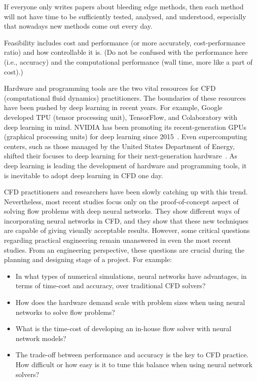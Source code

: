 
If everyone only writes papers about bleeding edge methods, then each method will not have time to be sufficiently tested, analysed, and understood, especially that nowadays new methods come out every day.

Feasibility includes cost and performance (or more accurately, cost-performance ratio) and how controllable it is.
(Do not be confused with the performance here (i.e., accuracy) and the computational performance (wall time, more like a part of cost).)

Hardware and programming tools are the two vital resources for CFD (computational fluid dynamics) practitioners.
The boundaries of these resources have been pushed by deep learning in recent years.
For example, Google developed TPU (tensor processing unit), TensorFlow, and Colaboratory with deep learning in mind.
NVIDIA has been promoting its recent-generation GPUs (graphical processing units) for deep learning since 2015~\cite{Buck2015}.
Even supercomputing centers, such as those managed by the United States Department of Energy, shifted their focuses to deep learning for their next-generation hardware~\cite{USDepartmentofEnergy2019}.
As deep learning is leading the development of hardware and programming tools, it is inevitable to adopt deep learning in CFD one day.

CFD practitioners and researchers have been slowly catching up with this trend.
Nevertheless, most recent studies focus only on the proof-of-concept aspect of solving flow problems with deep neural networks.
They show different ways of incorporating neural networks in CFD, and they show that these new techniques are capable of giving visually acceptable results.
However, some critical questions regarding practical engineering remain unanswered in even the most recent studies.
From an engineering perspective, these questions are crucial during the planning and designing stage of a project.
For example:

\begin{itemize}
    \item In what types of numerical simulations, neural networks have advantages, in terms of time-cost and accuracy, over traditional CFD solvers?
    \item How does the hardware demand scale with problem sizes when using neural networks to solve flow problems?
    \item What is the time-cost of developing an in-house flow solver with neural network models?
    \item The trade-off between performance and accuracy is the key to CFD practice. How difficult or how easy is it to tune this balance when using neural network solvers?
\end{itemize}
    
